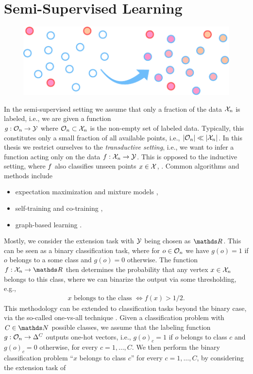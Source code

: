 \section{Semi-Supervised Learning}\label{sec:PSSL}
\begin{figure}
\centering
\includegraphics[width=.5\textwidth]{atelier/paradigms/SSL.pdf}
\end{figure}
%
In the semi-supervised setting we assume that only a fraction of the data $\mathcal{X}_n$ is labeled, i.e., we are given a function\\ $g:\mathcal{O}_n\to\mathcal{\mathcal{Y}}$ where $\mathcal{O}_n\subset\mathcal{X}_n$ is the non-empty set of labeled data. Typically, this constitutes only a small fraction of all available points, i.e., $\left|\mathcal{O}_n\right|\ll\left|\mathcal{X}_n\right|$. In this thesis we restrict ourselves to the \emph{transductive setting}, i.e., we want to infer a function acting only on the data $f: \mathcal{X}_n\to \mathcal{\mathcal{Y}}$. This is opposed to the inductive setting, where $f$ also classifies unseen points $x\in\mathcal{X}$, \cite{zhu2005semi}. Common algorithms and methods include
%
\begin{itemize}
\item expectation maximization and mixture models \cite{dempster1977maximum,cozman2003semi},
\item self-training and co-training \cite{blum1998combining},
\item graph-based learning \cite{zhu2005semi}.
\end{itemize}
%
%
Mostly, we consider the extension task with $\mathcal{\mathcal{Y}}$ being chosen as $\R$. This can be seen as a binary classification task, where for $o\in\mathcal{O}_n$ we have $g(o)=1$ if $o$ belongs to a some class and $g(o)=0$ otherwise. The function $f:\Inp_n\to\R$ then determines the probability that any vertex $x\in \mathcal{X}_n$ belongs to this class, where we can binarize the output via some thresholding, e.g.,
%
\begin{align*}
x \text{ belongs to the class } \Leftrightarrow f(x) > 1/2.	
\end{align*}
%
This methodology can be extended to classification tasks beyond the binary case, via the so-called one-vs-all technique \cite{zhu2003semi}. Given a classification problem with $C\in\N$ possible classes, we assume that the labeling function $g:\mathcal{O}_n\to \Delta^C$ outputs one-hot vectors, i.e., $g(o)_c =1$ if $o$ belongs to class $c$ and $g(o)_c=0$ otherwise, for every $c = 1,\ldots, C$. We then perform the binary classification problem \enquote{$x$ belongs to class $c$} for every $c=1,\ldots,C$, by considering the extension task of 
